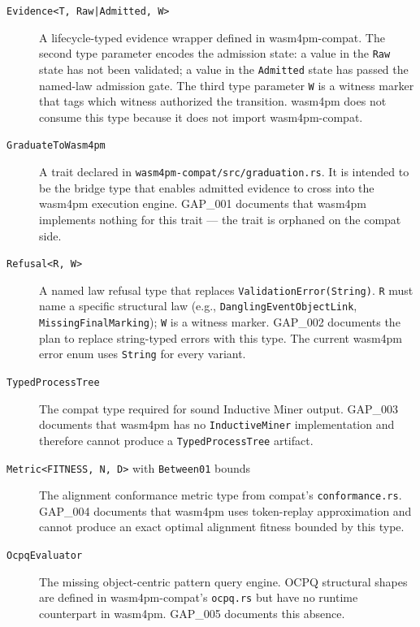 \begin{description}
  \item[\texttt{Evidence<T, Raw|Admitted, W>}] A lifecycle-typed evidence wrapper defined
        in wasm4pm-compat. The second type parameter encodes the admission state: a value
        in the \texttt{Raw} state has not been validated; a value in the \texttt{Admitted}
        state has passed the named-law admission gate. The third type parameter \texttt{W}
        is a witness marker that tags which witness authorized the transition. wasm4pm does
        not consume this type because it does not import wasm4pm-compat.

  \item[\texttt{GraduateToWasm4pm}] A trait declared in
        \texttt{wasm4pm-compat/src/graduation.rs}. It is intended to be the bridge type
        that enables admitted evidence to cross into the wasm4pm execution engine.
        GAP\_001 documents that wasm4pm implements nothing for this trait — the trait is
        orphaned on the compat side.

  \item[\texttt{Refusal<R, W>}] A named law refusal type that replaces
        \texttt{ValidationError(String)}. \texttt{R} must name a specific structural law
        (e.g., \texttt{DanglingEventObjectLink}, \texttt{MissingFinalMarking}); \texttt{W}
        is a witness marker. GAP\_002 documents the plan to replace string-typed errors
        with this type. The current wasm4pm error enum uses \texttt{String} for every
        variant.

  \item[\texttt{TypedProcessTree}] The compat type required for sound Inductive Miner
        output. GAP\_003 documents that wasm4pm has no \texttt{InductiveMiner}
        implementation and therefore cannot produce a \texttt{TypedProcessTree} artifact.

  \item[\texttt{Metric<FITNESS, N, D>} with \texttt{Between01} bounds] The alignment
        conformance metric type from compat's \texttt{conformance.rs}. GAP\_004 documents
        that wasm4pm uses token-replay approximation and cannot produce an exact optimal
        alignment fitness bounded by this type.

  \item[\texttt{OcpqEvaluator}] The missing object-centric pattern query engine. OCPQ
        structural shapes are defined in wasm4pm-compat's \texttt{ocpq.rs} but have no
        runtime counterpart in wasm4pm. GAP\_005 documents this absence.


\end{description}
